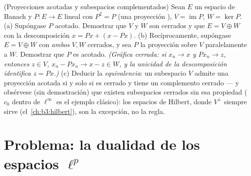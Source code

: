 \begin{exercise}[$\star\star$]\label{exo:b3:banach:12}
(Proyecciones acotadas y subespacios complementados) Sean $E$ un espacio
de Banach y $P \colon E \to E$ lineal con $P^2 = P$ (una proyección
), $V = \operatorname{im}P$,
$W =
\ker P$. (a) Supóngase $P$ acotado. Demostrar que $V$ y $W$ son cerrados
y que $E = V \oplus W$ con la descomposición $x = Px + (x -
Px)$. (b) Recíprocamente, supóngase $E = V \oplus W$ con \emph{ambos}
$V,
W$ cerrados, y sea $P$ la proyección sobre $V$ paralelamente a $W$.
Demostrar que $P$ es acotado. \emph{(Gráfica cerrada: si $x_n \to x$ y
$Px_n \to z$, entonces $z \in V$, $x_n - Px_n \to x - z \in
W$, y la unicidad de la descomposición identifica $z =
Px$.)} (c) Deducir la \emph{equivalencia}: un subespacio $V$ admite una
proyección acotada si y solo si es cerrado y tiene un complemento
 cerrado --- y obsérvese
(sin demostración) que existen subespacios cerrados sin esa propiedad
($c_0$ dentro de $\ell^\infty$ es el ejemplo clásico): los espacios de
Hilbert, donde $V^\perp$ siempre sirve (el~\cref{ch:b3:hilbert}), son la
excepción, no la regla.
\end{exercise}

\section{Problema: la dualidad de los espacios
\texorpdfstring{$\ell^p$}{lp}}

